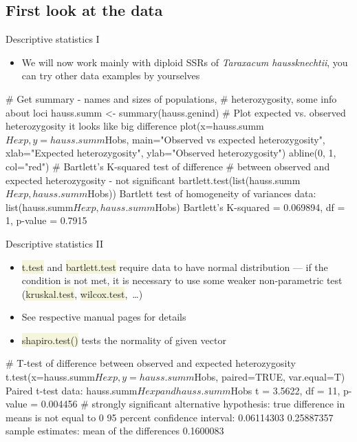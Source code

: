 \documentclass[compress, ucs, xelatex, 11pt, xcolor=svgnames, aspectratio=169,
	hyperref={
		bookmarks=true,
		unicode=true,
		colorlinks=true,
		pdftitle={Molecular data in R},
		plainpages=false,
		pdfauthor={Vojtech Zeisek},
		pdfsubject={Course about phylogeny and evolution in R},
		pdfcreator={XeLaTeX},
		pdfkeywords={R, evolution, phylogeny, molecular data},
		linkcolor=Crimson, %
		anchorcolor=Magenta, %
		citecolor=Magenta, %
		filecolor=Magenta, %
		menucolor=Magenta, %
		urlcolor=DodgerBlue, %
		pdftex},
	url={hyphens, lowtilde} %
	]{beamer}
\renewcommand{\texttt}[1]{\colorbox{Beige}{{\ttfamily #1}}}
\begin{document}
\subsection{First look at the data}

\begin{frame}[fragile]{Descriptive statistics I}
	\label{popgenindx}
	\begin{itemize}
		\item We will now work mainly with diploid SSRs of \textit{Taraxacum haussknechtii}, you can try other data examples by yourselves
	\end{itemize}
	\begin{spluscode}
    # Get summary - names and sizes of populations,
    # heterozygosity, some info about loci
    hauss.summ <- summary(hauss.genind)
    # Plot expected vs. observed heterozygosity it looks like big difference
    plot(x=hauss.summ$Hexp, y=hauss.summ$Hobs,
      main="Observed vs expected heterozygosity",
      xlab="Expected heterozygosity", ylab="Observed heterozygosity")
    abline(0, 1, col="red")
    # Bartlett's K-squared test of difference
    # between observed and expected heterozygosity - not significant
    bartlett.test(list(hauss.summ$Hexp, hauss.summ$Hobs))
                  Bartlett test of homogeneity of variances
    data:  list(hauss.summ$Hexp, hauss.summ$Hobs)
    Bartlett's K-squared = 0.069894, df = 1, p-value = 0.7915
	\end{spluscode}
\end{frame}

\begin{frame}[fragile]{Descriptive statistics II}
	\begin{itemize}
		\item \texttt{t.test} and \texttt{bartlett.test} require data to have normal distribution --- if the condition is not met, it is necessary to use some weaker non-parametric test (\texttt{kruskal.test}, \texttt{wilcox.test},~\ldots)
		\item See respective manual pages for details
		\item \texttt{shapiro.test()} tests the normality of given vector
	\end{itemize}
	\begin{spluscode}
    # T-test of difference between observed and expected heterozygosity
    t.test(x=hauss.summ$Hexp, y=hauss.summ$Hobs, paired=TRUE, var.equal=T)
                 Paired t-test
    data:  hauss.summ$Hexp and hauss.summ$Hobs
    t = 3.5622, df = 11, p-value = 0.004456 # strongly significant
    alternative hypothesis: true difference in means is not equal to 0
    95 percent confidence interval:
     0.06114303 0.25887357
    sample estimates:
    mean of the differences
                  0.1600083
	\end{spluscode}
\end{frame}
\end{document}
